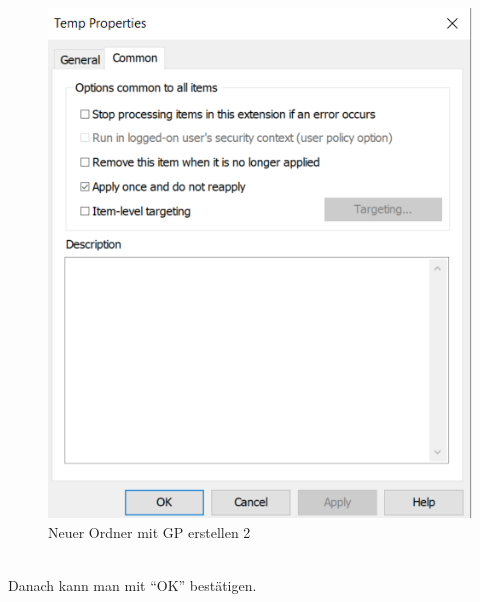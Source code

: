 \begin{minipage}{0.5\linewidth}
    \begin{figure}[H]
        \centering
        \includegraphics[width=0.7\linewidth]{../img/sysmon/new-folder-2.png}
        \caption{Neuer Ordner mit GP erstellen 2}
    \end{figure}
\end{minipage}\\

Danach kann man mit ``OK'' bestätigen.\\

